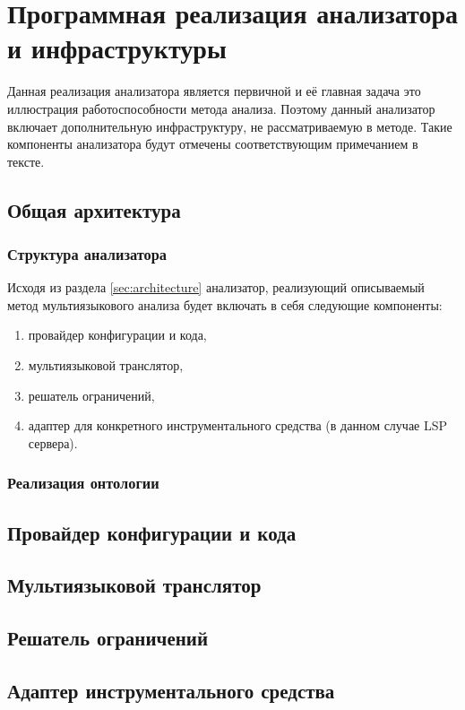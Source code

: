 \chapter{Программная реализация анализатора и инфраструктуры}

Данная реализация анализатора является первичной и её главная задача это иллюстрация работоспособности метода анализа.
Поэтому данный анализатор включает дополнительную инфраструктуру, не рассматриваемую в методе. Такие компоненты
анализатора будут отмечены соответствующим примечанием в тексте.

\section{Общая архитектура}

\subsection{Структура анализатора}

Исходя из раздела \ref{sec:architecture} анализатор, реализующий описываемый метод мультиязыкового анализа будет включать в себя следующие
компоненты:
\begin{enumerate}[1)]
    \item провайдер конфигурации и кода,
    \item мультиязыковой транслятор,
    \item решатель ограничений,
    \item адаптер для конкретного инструментального средства (в данном случае LSP сервера).
\end{enumerate}


\subsection{Реализация онтологии}

\section{Провайдер конфигурации и кода}

\section{Мультиязыковой транслятор}

\section{Решатель ограничений}

\section{Адаптер инструментального средства}

